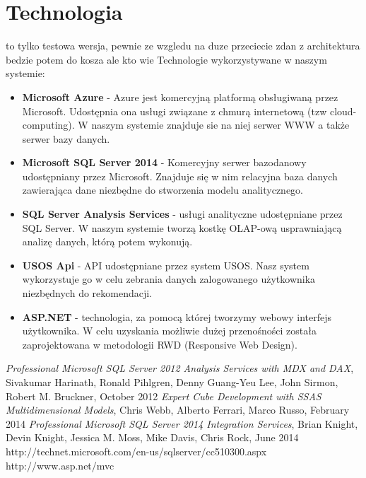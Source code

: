 \documentclass[licencjacka]{pracamgr}
\begin{document}
 \chapter{Technologia}
to tylko testowa wersja, pewnie ze wzgledu na duze przeciecie zdan z architektura bedzie potem do kosza ale kto wie \newline
Technologie wykorzystywane w naszym systemie:
\begin{itemize}

\item \textbf{Microsoft Azure} - Azure jest komercyjną platformą obsługiwaną przez Microsoft. Udostępnia ona usługi związane z chmurą internetową (tzw cloud-computing). W naszym systemie znajduje sie na niej serwer WWW a także serwer bazy danych. 

\item \textbf{Microsoft SQL Server 2014} - Komercyjny serwer bazodanowy udostępniany przez Microsoft. Znajduje się w nim relacyjna baza danych zawierająca dane niezbędne do stworzenia modelu analitycznego. 

\item \textbf{SQL Server Analysis Services} - usługi analityczne udostępniane przez SQL Server. W naszym systemie tworzą kostkę OLAP-ową usprawniającą analizę danych, którą potem wykonują.

\item \textbf {USOS Api} - API udostępniane przez system USOS. Nasz system wykorzystuje go w celu zebrania danych zalogowanego użytkownika niezbędnych do rekomendacji.

\item \textbf{ASP.NET} - technologia, za pomocą której tworzymy webowy interfejs użytkownika. W celu uzyskania możliwie dużej przenośności została zaprojektowana w metodologii RWD (Responsive Web Design).  

\end{itemize}

\begin{thebibliography}{99}
\emph{Professional Microsoft SQL Server 2012 Analysis Services with MDX and DAX},
Sivakumar Harinath, Ronald Pihlgren, Denny Guang-Yeu Lee, John Sirmon, Robert M. Bruckner,
October 2012
\emph{Expert Cube Development with SSAS Multidimensional Models},
Chris Webb, Alberto Ferrari, Marco Russo,
February 2014
\emph{Professional Microsoft SQL Server 2014 Integration Services},
Brian Knight, Devin Knight, Jessica M. Moss, Mike Davis, Chris Rock,
June 2014
http://technet.microsoft.com/en-us/sqlserver/cc510300.aspx
http://www.asp.net/mvc
\end{thebibliography}
\end{document}
